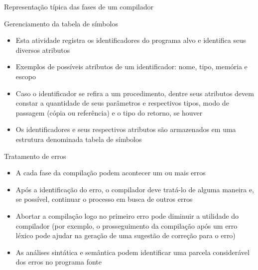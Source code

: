 \begin{frame}[fragile]{Representação típica das fases de um compilador}
\begin{figure}
    \end{figure}

\end{frame}

\begin{frame}[fragile]{Gerenciamento da tabela de símbolos}

    \begin{itemize}
        \item Esta atividade registra os identificadores do programa alvo e identifica seus diversos atributos
        \pause

        \item Exemplos de possíveis atributos de um identificador: nome, tipo, memória e escopo
        \pause

        \item Caso o identificador se refira a um procedimento, dentre seus atributos devem constar a quantidade de seus parâmetros e respectivos tipos, modo 
            de passagem (cópia ou referência) e o tipo do retorno, se houver
        \pause

        \item Os identificadores e seus respectivos atributos são armazenados em uma estrutura denominada tabela de símbolos
    \end{itemize}

\end{frame}

\begin{frame}[fragile]{Tratamento de erros}

    \begin{itemize}
        \item A cada fase da compilação podem acontecer um ou mais erros
        \pause

        \item Após a identificação do erro, o compilador deve tratá-lo de alguma maneira e, se possível, continuar o processo em busca de outros erros
        \pause

        \item Abortar a compilação logo no primeiro erro pode diminuir a utilidade do compilador (por exemplo, o prosseguimento da compilação após um erro
            léxico pode ajudar na geração de uma sugestão de correção para o erro)
        \pause

        \item As análises sintática e semântica podem identificar uma parcela considerável dos erros no programa fonte
    \end{itemize}

\end{frame}

